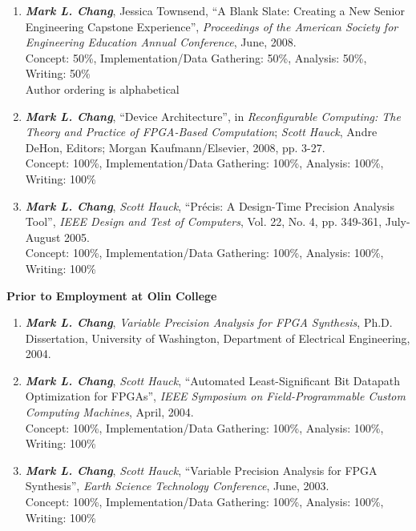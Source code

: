 \documentclass[line]{res}
\begin{document}
\begin{resume}
\begin{enumerate}
		\item \textbf{\textit{Mark L. Chang}}, Jessica Townsend, ``A Blank Slate: Creating a New Senior Engineering Capstone Experience'', \emph{Proceedings of the American Society for Engineering Education Annual Conference}, June, 2008.\\
		Concept: 50\%, Implementation/Data Gathering: 50\%, Analysis: 50\%, Writing: 50\%\\
		Author ordering is alphabetical
		
		\item \textbf{\textit{Mark L. Chang}}, ``Device Architecture'', in \emph{Reconfigurable Computing: The Theory and Practice of FPGA-Based Computation}; \textit{Scott Hauck}, Andre DeHon, Editors; Morgan Kaufmann/Elsevier, 2008, pp. 3-27.\\
		Concept: 100\%, Implementation/Data Gathering: 100\%, Analysis: 100\%, Writing: 100\%
		
		\item \textbf{\textit{Mark L. Chang}}, \textit{Scott Hauck}, ``Pr\'{e}cis: A Design-Time Precision Analysis Tool'', \emph{IEEE Design and Test of Computers}, Vol. 22, No. 4, pp. 349-361, July-August 2005.\\
		Concept: 100\%, Implementation/Data Gathering: 100\%, Analysis: 100\%, Writing: 100\% 
	\end{enumerate}
	
	\textbf{Prior to Employment at Olin College}
	\begin{enumerate}
		\item \textbf{\textit{Mark L. Chang}}, \emph{Variable Precision Analysis for FPGA Synthesis}, Ph.D. Dissertation, University of Washington, Department of Electrical Engineering, 2004.
		
		\item \textbf{\textit{Mark L. Chang}}, \textit{Scott Hauck}, ``Automated Least-Significant Bit Datapath Optimization for \mbox{FPGAs}'', \emph{IEEE Symposium on Field-Programmable Custom Computing Machines}, April, 2004.\\
		Concept: 100\%, Implementation/Data Gathering: 100\%, Analysis: 100\%, Writing: 100\%
		
		\item \textbf{\textit{Mark L. Chang}}, \textit{Scott Hauck}, ``Variable Precision Analysis for FPGA Synthesis'', \emph{Earth Science Technology Conference}, June, 2003.\\
		Concept: 100\%, Implementation/Data Gathering: 100\%, Analysis: 100\%, Writing: 100\%
		

\end{enumerate}
\end{resume}
\end{document}
